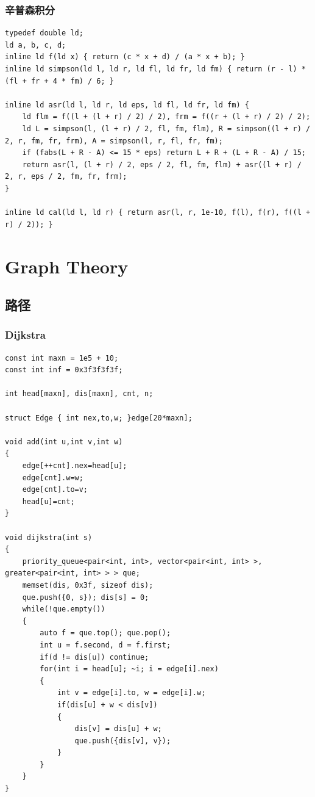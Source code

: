 \documentclass[twoside]{article}
\begin{document}
\subsubsection{辛普森积分}
\begin{lstlisting}
typedef double ld;
ld a, b, c, d;
inline ld f(ld x) { return (c * x + d) / (a * x + b); }
inline ld simpson(ld l, ld r, ld fl, ld fr, ld fm) { return (r - l) * (fl + fr + 4 * fm) / 6; }

inline ld asr(ld l, ld r, ld eps, ld fl, ld fr, ld fm) {
    ld flm = f((l + (l + r) / 2) / 2), frm = f((r + (l + r) / 2) / 2);
    ld L = simpson(l, (l + r) / 2, fl, fm, flm), R = simpson((l + r) / 2, r, fm, fr, frm), A = simpson(l, r, fl, fr, fm);
    if (fabs(L + R - A) <= 15 * eps) return L + R + (L + R - A) / 15;
    return asr(l, (l + r) / 2, eps / 2, fl, fm, flm) + asr((l + r) / 2, r, eps / 2, fm, fr, frm);
}

inline ld cal(ld l, ld r) { return asr(l, r, 1e-10, f(l), f(r), f((l + r) / 2)); }\end{lstlisting}
\clearpage\section{Graph Theory}
\subsection{路径}
\subsubsection{Dijkstra}
\begin{lstlisting}
const int maxn = 1e5 + 10;
const int inf = 0x3f3f3f3f;

int head[maxn], dis[maxn], cnt, n;

struct Edge { int nex,to,w; }edge[20*maxn];

void add(int u,int v,int w)
{
    edge[++cnt].nex=head[u];
    edge[cnt].w=w;
    edge[cnt].to=v;
    head[u]=cnt;
}

void dijkstra(int s)
{
    priority_queue<pair<int, int>, vector<pair<int, int> >, greater<pair<int, int> > > que;
    memset(dis, 0x3f, sizeof dis);
    que.push({0, s}); dis[s] = 0;
    while(!que.empty())
    {
        auto f = que.top(); que.pop();
        int u = f.second, d = f.first;
        if(d != dis[u]) continue;
        for(int i = head[u]; ~i; i = edge[i].nex)
        {
            int v = edge[i].to, w = edge[i].w;
            if(dis[u] + w < dis[v])
            {
                dis[v] = dis[u] + w;
                que.push({dis[v], v});
            }
        }
    }
}\end{lstlisting}
\end{document}
